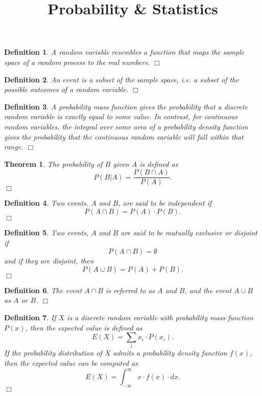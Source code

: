 \documentclass[11pt, letterpaper]{article}
\newenvironment{definition}
{\noindent\begin{defn}}
{\hfill $\Box$ \end{defn}}
\newtheorem{defn}{Definition}
\newenvironment{theorem}
{\noindent\begin{thm}}
{\hfill $\Box$ \end{thm}}
\newtheorem{thm}{Theorem}
\begin{document}
\title{Probability \& Statistics}
\maketitle

\begin{definition}
A \textit{random variable} resembles a function that maps the sample space of a random process to the real numbers.
\end{definition}

\begin{definition}
An \textit{event} is a subset of the sample space, i.e. a subset of the possible outcomes of a random variable.
\end{definition}

\begin{definition}
A \textit{probability mass function} gives the probability that a discrete random variable is exactly equal to some value.  In contrast, for continuous random variables, the integral over some area of a \textit{probability density function} gives the probability that the continuous random variable will fall within that range.
\end{definition}



\begin{theorem}
The probability of $B$ given $A$ is defined as
\[
	P(B|A) = \frac{P(B \cap A)}{P(A)}.
\]
\end{theorem}

\begin{definition}
Two events, $A$ and $B$, are said to be \textit{independent} if
\[
	P(A \cap B) = P(A) \cdot P(B).
\]
\end{definition}

\begin{definition}
Two events, $A$ and $B$ are said to be \textit{mutually exclusive} or \textit{disjoint} if
\[
	P(A \cap B) = \emptyset
\]
and if they are disjoint, then
\[
	P(A \cup B) = P(A) + P(B).
\]
\end{definition}

\begin{definition}
The event $A \cap B$ is referred to as $A$ \textit{and} $B$, and the event $A \cup B$ as $A$ \textit{or} $B$.
\end{definition}

\begin{definition}
If $X$ is a discrete random variable with probability mass function $P(x)$, then the \textit{expected value} is defined as
\[
	E(X) = \sum_i x_i \cdot P(x_i).
\]
If the probability distribution of $X$ admits a probability density function $f(x)$, then the \textit{expected value} can be computed as
\[
	E(X) = \int_{-\infty}^{\infty} x \cdot f(x) \cdot dx.
\]
\end{definition}
\end{document}
